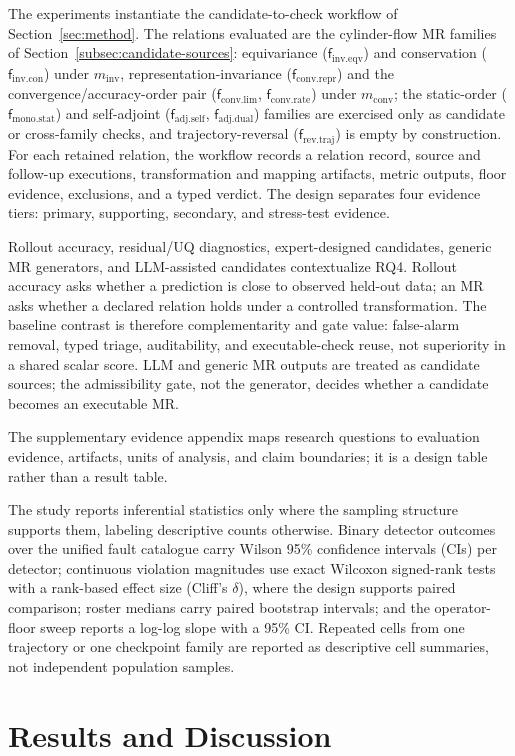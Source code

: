 \documentclass[preprint,12pt]{elsarticle}
\providecommand{\minv}{m_{\mathrm{inv}}}
\providecommand{\mconv}{m_{\mathrm{conv}}}
\providecommand{\fIeqv}{\mathsf{f}_{\mathrm{inv}.\mathrm{eqv}}}
\providecommand{\fIcon}{\mathsf{f}_{\mathrm{inv}.\mathrm{con}}}
\providecommand{\fAself}{\mathsf{f}_{\mathrm{adj}.\mathrm{self}}}
\providecommand{\fAdual}{\mathsf{f}_{\mathrm{adj}.\mathrm{dual}}}
\providecommand{\fRtraj}{\mathsf{f}_{\mathrm{rev}.\mathrm{traj}}}
\providecommand{\fMstat}{\mathsf{f}_{\mathrm{mono}.\mathrm{stat}}}
\providecommand{\fClim}{\mathsf{f}_{\mathrm{conv}.\mathrm{lim}}}
\providecommand{\fCrate}{\mathsf{f}_{\mathrm{conv}.\mathrm{rate}}}
\providecommand{\fCrepr}{\mathsf{f}_{\mathrm{conv}.\mathrm{repr}}}
\begin{document}
The experiments instantiate the candidate-to-check workflow of Section~\ref{sec:method}. The relations evaluated are the cylinder-flow MR families of Section~\ref{subsec:candidate-sources}: equivariance ($\fIeqv$) and conservation ($\fIcon$) under $\minv$, representation-invariance ($\fCrepr$) and the convergence/accuracy-order pair ($\fClim$, $\fCrate$) under $\mconv$; the static-order ($\fMstat$) and self-adjoint ($\fAself$, $\fAdual$) families are exercised only as candidate or cross-family checks, and trajectory-reversal ($\fRtraj$) is empty by construction. For each retained relation, the workflow records a relation record, source and follow-up executions, transformation and mapping artifacts, metric outputs, floor evidence, exclusions, and a typed verdict. The design separates four evidence tiers: primary, supporting, secondary, and stress-test evidence.

Rollout accuracy, residual/UQ diagnostics, expert-designed candidates, generic MR generators, and LLM-assisted candidates contextualize RQ4. Rollout accuracy asks whether a prediction is close to observed held-out data; an MR asks whether a declared relation holds under a controlled transformation. The baseline contrast is therefore complementarity and gate value: false-alarm removal, typed triage, auditability, and executable-check reuse, not superiority in a shared scalar score. LLM and generic MR outputs are treated as candidate sources; the admissibility gate, not the generator, decides whether a candidate becomes an executable MR.

The supplementary evidence appendix maps research questions to evaluation evidence, artifacts, units of analysis, and claim boundaries; it is a design table rather than a result table.

The study reports inferential statistics only where the sampling structure supports them, labeling descriptive counts otherwise. Binary detector outcomes over the unified fault catalogue carry Wilson 95\% confidence intervals (CIs) per detector; continuous violation magnitudes use exact Wilcoxon signed-rank tests with a rank-based effect size (Cliff's $\delta$), where the design supports paired comparison; roster medians carry paired bootstrap intervals; and the operator-floor sweep reports a log-log slope with a 95\% CI. Repeated cells from one trajectory or one checkpoint family are reported as descriptive cell summaries, not independent population samples.

\section{Results and Discussion}
\label{sec:results}
\end{document}
